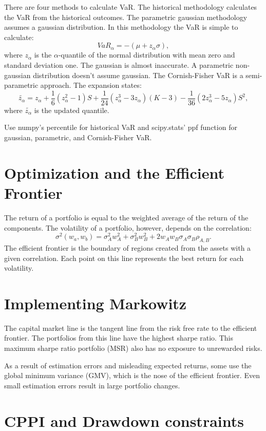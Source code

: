 \documentclass{article}
\begin{document}
There are four methods to calculate VaR.
The historical methodology calculates the VaR 
from the historical outcomes. The parametric gaussian
methodology assumes a gaussian distribution. In
this methodology the VaR is simple to calculate:
\[
VaR_\alpha = -(\mu + z_\alpha \sigma),
\]
where $z_\alpha$ is the $\alpha$-quantile of the
normal distribution with mean zero and standard
deviation one. The gaussian is almost inaccurate.
A parametric non-gaussian distribution doesn't
assume gaussian. The Cornish-Fisher VaR is a
semi-parametric approach. The expansion states:
\[
\tilde{z_\alpha} = z_\alpha + 
\frac{1}{6}(z_\alpha^2 - 1)S + 
\frac{1}{24}(z_\alpha^3 - 3z_\alpha)(K-3) -
\frac{1}{36}(2z_\alpha^3 - 5z_\alpha)S^2,
\] 
where $\tilde{z_\alpha}$ is the updated quantile.

Use numpy's percentile for historical VaR and
scipy.stats' ppf function for gaussian, parametric,
and Cornish-Fisher VaR.

\section[2.1]{Optimization and the Efficient Frontier}

The return of a portfolio is equal to the 
weighted average of the return of the components.
The volatility of a portfolio, however, depends
on the correlation:
\[
\sigma^2(w_a, w_b) =
\sigma^2_A w^2_A + \sigma^2_B w^2_B + 
2 w_A w_B \sigma_A \sigma_B \rho_{A,B}.
\]
The efficient frontier is the boundary of regions
created from the assets with a given correlation.
Each point on this line represents the best return
for each volatility. 

\section[2.2]{Implementing Markowitz}

The capital market line is the tangent line
from the risk free rate to the efficient frontier.
The portfolios from this line have the highest 
sharpe ratio. This maximum sharpe ratio portfolio (MSR)
also has no exposure to unrewarded risks. 

As a result of estimation errors and misleading
expected returns, some use the global minimum variance
(GMV), which is the nose of the efficient frontier. 
Even small estimation errors result in large portfolio
changes. 

\section[3.1]{CPPI and Drawdown constraints}
\end{document}
